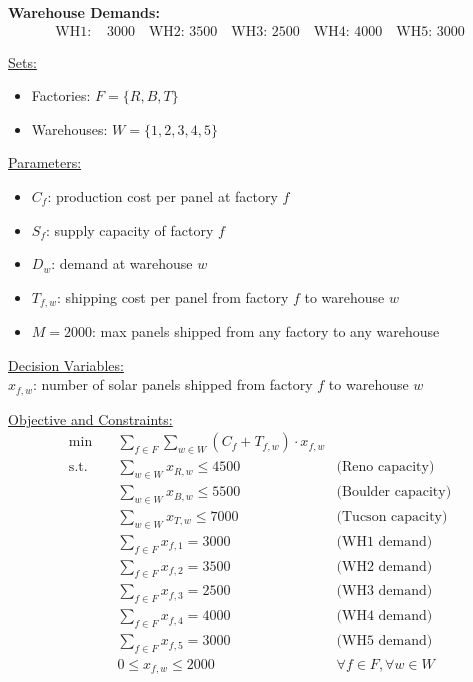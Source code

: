 \textbf{Warehouse Demands:}
\[
\begin{aligned}
\text{WH1: } & 3000 \quad \text{WH2: } 3500 \quad \text{WH3: } 2500 \quad \text{WH4: } 4000 \quad \text{WH5: } 3000
\end{aligned}
\]

\begin{solution}

\smallskip \underline{Sets:}
\begin{itemize}
\item Factories: \( F = \{R, B, T\} \)
\item Warehouses: \( W = \{1, 2, 3, 4, 5\} \)
\end{itemize}

\smallskip \underline{Parameters:}
\begin{itemize}
\item \( C_f \): production cost per panel at factory \( f \)
\item \( S_f \): supply capacity of factory \( f \)
\item \( D_w \): demand at warehouse \( w \)
\item \( T_{f,w} \): shipping cost per panel from factory \( f \) to warehouse \( w \)
\item \( M = 2000 \): max panels shipped from any factory to any warehouse
\end{itemize}

\smallskip \underline{Decision Variables:} \\
\( x_{f,w} \): number of solar panels shipped from factory \( f \) to warehouse \( w \)

\smallskip \underline{Objective and Constraints:}
\begin{align*}
\min\quad & \sum_{f \in F} \sum_{w \in W} (C_f + T_{f,w}) \cdot x_{f,w} \\
\text{s.t.} \quad 
& \sum_{w \in W} x_{R,w} \leq 4500 & \text{(Reno capacity)} \\
& \sum_{w \in W} x_{B,w} \leq 5500 & \text{(Boulder capacity)} \\
& \sum_{w \in W} x_{T,w} \leq 7000 & \text{(Tucson capacity)} \\
& \sum_{f \in F} x_{f,1} = 3000 & \text{(WH1 demand)} \\
& \sum_{f \in F} x_{f,2} = 3500 & \text{(WH2 demand)} \\
& \sum_{f \in F} x_{f,3} = 2500 & \text{(WH3 demand)} \\
& \sum_{f \in F} x_{f,4} = 4000 & \text{(WH4 demand)} \\
& \sum_{f \in F} x_{f,5} = 3000 & \text{(WH5 demand)} \\
& 0 \leq x_{f,w} \leq 2000 & \forall f \in F, \forall w \in W \\
\end{align*}

\end{solution}



